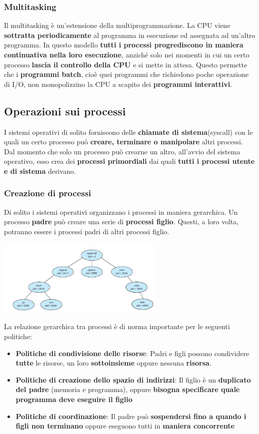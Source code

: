 \documentclass[12pt]{article}
\begin{document}
\subsubsection{Multitasking}
Il multitasking è un'estensione della multiprogrammazione. La CPU viene \textbf{sottratta periodicamente} al programma in esecuzione ed assegnata ad un'altro programma. In questo modello \textbf{tutti i processi progrediscono in maniera continuativa nella loro esecuzione}, anziché solo nei momenti in cui un certo processo \textbf{lascia il controllo della CPU} e si mette in attesa.
Questo permette che i \textbf{programmi batch}, cioè quei programmi che richiedono poche operazione di I/O, non monopolizzino la CPU a scapito dei \textbf{programmi interattivi}.
\subsection{Operazioni sui processi}
I sistemi operativi di solito forniscono delle \textbf{chiamate di sistema}(syscall) con le quali un certo processo può \textbf{creare, terminare o manipolare} altri processi. Dal momento che solo un processo può crearne un altro, all'avvio del sistema operativo, esso crea dei \textbf{processi primordiali} dai quali \textbf{tutti i processi utente e di sistema} derivano.
\subsubsection{Creazione di processi}
Di solito i sistemi operativi organizzano i processi in maniera gerarchica. Un processo \textbf{padre} può creare una serie di \textbf{processi figlio}. Questi, a loro volta, potranno essere i processi padri di altri processi figlio.
\begin{center}
    \includegraphics[width = 0.60\textwidth]{Images/52.PNG}
\end{center}
La relazione gerarchica tra processi è di norma importante per le seguenti politiche:
\begin{itemize}
    \item \textbf{Politiche di condivisione delle risorse}: Padri e figli possono condividere \textbf{tutte} le risorse, un loro \textbf{sottoinsieme} oppure nessuna \textbf{risorsa}.
    \item \textbf{Politiche di creazione dello spazio di indirizzi}: Il figlio è un \textbf{duplicato del padre} (memoria e programma), oppure \textbf{bisogna specificare quale programma deve eseguire il figlio}
    \item \textbf{Politiche di coordinazione}: Il padre può \textbf{sospendersi fino a quando i figli non terminano} oppure eseguono tutti in \textbf{maniera concorrente}
\end{itemize}
\end{document}
